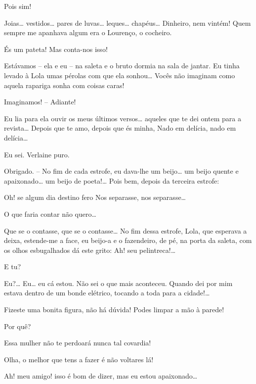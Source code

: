  Pois sim!

 Joias\ldots{} vestidos\ldots{} pares de luvas\ldots{} leques\ldots{} chapéus\ldots{}
Dinheiro, nem vintém! Quem sempre me apanhava algum era o Lourenço, o cocheiro.

 És um pateta! Mas conta-nos isso!

 Estávamos -- ela e eu -- na saleta e o bruto dormia na sala de
jantar. Eu tinha levado à Lola umas pérolas com que ela sonhou\ldots{} Vocês não
imaginam como aquela rapariga sonha com coisas caras!

 Imaginamos! -- Adiante!

 Eu lia para ela ouvir os meus últimos versos\ldots{} aqueles que te
dei ontem para a revista\ldots{} Depois que te amo, depois que és minha, Nado em delícia, nado em delícia\ldots{}

 Eu sei. Verlaine puro.

 Obrigado. -- No fim de cada estrofe, eu dava-lhe um beijo\ldots{} um
beijo quente e apaixonado\ldots{} um beijo de poeta!\ldots{} Pois bem, depois da terceira
estrofe:

 Oh! se algum dia destino fero 
 Nos separasse, nos separasse\ldots{}

  O que faria contar não quero\ldots{}

 Que se o contasse, que se o contasse\ldots{} 
No fim dessa estrofe, Lola, que esperava a deixa, estende-me a face, eu
beijo-a e o fazendeiro, de pé, na porta da saleta, com os olhos esbugalhados dá este
grito: Ah! seu pelintreca!\ldots{}

 E tu?

 Eu?\ldots{} Eu\ldots{} eu cá estou. Não sei o que mais aconteceu. Quando
dei por mim estava dentro de um bonde elétrico, tocando a toda para a
cidade!\ldots{}

 Fizeste uma bonita figura, não há dúvida! Podes limpar a mão
à parede!

 Por quê?

 Essa mulher não te perdoará nunca tal covardia!

 Olha, o melhor que tens a fazer é não voltares lá!

 Ah! meu amigo! isso é bom de dizer, mas eu estou apaixonado\ldots{}

